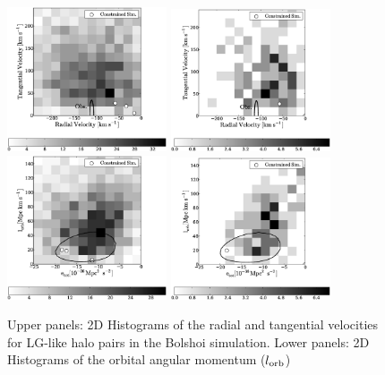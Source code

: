 \documentclass{emulateapj}
\begin{document}
\begin{figure}
\begin{center}
\includegraphics[keepaspectratio=true,width=0.42\textwidth]{fig_1a.eps}
\includegraphics[keepaspectratio=true,width=0.42\textwidth]{fig_1b.eps}
\includegraphics[keepaspectratio=true,width=0.42\textwidth]{fig_1c.eps}
\includegraphics[keepaspectratio=true,width=0.42\textwidth]{fig_1d.eps}
\caption{Upper panels: 2D Histograms of the radial and tangential
  velocities for LG-like halo pairs in the Bolshoi simulation.   Lower
  panels: 2D Histograms of the orbital angular momentum ($l_{\rm orb}$)
}
\end{center}
\end{figure}
\end{document}
